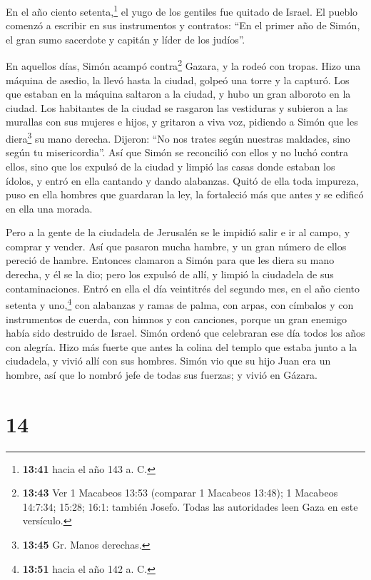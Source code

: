  En el año ciento setenta,\footnote{\textbf{13:41} hacia
  el año 143 a. C.} el yugo de los gentiles fue quitado de Israel.
 El pueblo comenzó a escribir en sus instrumentos y
contratos: ``En el primer año de Simón, el gran sumo sacerdote y capitán
y líder de los judíos''.

 En aquellos días, Simón acampó contra\footnote{\textbf{13:43}
  Ver 1 Macabeos 13:53 (comparar 1 Macabeos 13:48); 1 Macabeos 14:7:34;
  15:28; 16:1: también Josefo. Todas las autoridades leen Gaza en este
  versículo.} Gazara, y la rodeó con tropas. Hizo una máquina de asedio,
la llevó hasta la ciudad, golpeó una torre y la capturó. 
Los que estaban en la máquina saltaron a la ciudad, y hubo un gran
alboroto en la ciudad.  Los habitantes de la ciudad se
rasgaron las vestiduras y subieron a las murallas con sus mujeres e
hijos, y gritaron a viva voz, pidiendo a Simón que les diera\footnote{\textbf{13:45}
  Gr. Manos derechas.} su mano derecha.  Dijeron: ``No
nos trates según nuestras maldades, sino según tu misericordia''.
 Así que Simón se reconcilió con ellos y no luchó contra
ellos, sino que los expulsó de la ciudad y limpió las casas donde
estaban los ídolos, y entró en ella cantando y dando alabanzas.
 Quitó de ella toda impureza, puso en ella hombres que
guardaran la ley, la fortaleció más que antes y se edificó en ella una
morada.

 Pero a la gente de la ciudadela de Jerusalén se le
impidió salir e ir al campo, y comprar y vender. Así que pasaron mucha
hambre, y un gran número de ellos pereció de hambre. 
Entonces clamaron a Simón para que les diera su mano derecha, y él se la
dio; pero los expulsó de allí, y limpió la ciudadela de sus
contaminaciones.  Entró en ella el día veintitrés del
segundo mes, en el año ciento setenta y uno,\footnote{\textbf{13:51}
  hacia el año 142 a. C.} con alabanzas y ramas de palma, con arpas, con
címbalos y con instrumentos de cuerda, con himnos y con canciones,
porque un gran enemigo había sido destruido de Israel. 
Simón ordenó que celebraran ese día todos los años con alegría. Hizo más
fuerte que antes la colina del templo que estaba junto a la ciudadela, y
vivió allí con sus hombres.  Simón vio que su hijo Juan
era un hombre, así que lo nombró jefe de todas sus fuerzas; y vivió en
Gázara.

\hypertarget{section-13}{%
\section{14}\label{section-13}}

